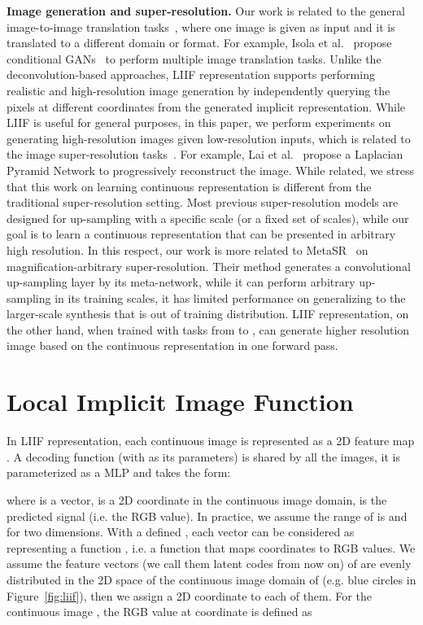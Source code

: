 \documentclass[final]{cvpr}
\begin{document}
\textbf{Image generation and super-resolution.} Our work is related to the general image-to-image translation tasks~\cite{zhang2016colorful,pix2pix2017,zhu2017unpaired,hoffman2018cycada,denton2015deep}, where one image is given as input and it is translated to a different domain or format. For example, Isola et al.~\cite{pix2pix2017} propose conditional GANs~\cite{goodfellow2014generative} to perform multiple image translation tasks. Unlike the deconvolution-based approaches, LIIF representation supports performing realistic and high-resolution image generation by independently querying the pixels at different coordinates from the generated implicit representation. While LIIF is useful for general purposes, in this paper, we perform experiments on generating high-resolution images given low-resolution inputs, which is related to the image super-resolution tasks~\cite{chang2004super,timofte2013anchored,tai2017memnet,dong2014learning,ledig2017photo,lim2017enhanced,lai2017deep,zhang2018residual,zhang2020deep}. For example, Lai et al.~\cite{lai2017deep} propose a Laplacian Pyramid Network to progressively reconstruct the image. While related, we stress that this work on learning continuous representation is different from the traditional super-resolution setting. Most previous super-resolution models are designed for up-sampling with a specific scale (or a fixed set of scales), while our goal is to learn a continuous representation that can be presented in arbitrary high resolution. In this respect, our work is more related to MetaSR~\cite{hu2019meta} on magnification-arbitrary super-resolution. Their method generates a convolutional up-sampling layer by its meta-network, while it can perform arbitrary up-sampling in its training scales, it has limited performance on generalizing to the larger-scale synthesis that is out of training distribution. LIIF representation, on the other hand, when trained with tasks from  to , can generate  higher resolution image based on the continuous representation in one forward pass.

\section{Local Implicit Image Function}

In LIIF representation, each continuous image  is represented as a 2D feature map . A decoding function  (with  as its parameters) is shared by all the images, it is parameterized as a MLP and takes the form:

where  is a vector,  is a 2D coordinate in the  continuous image domain,  is the predicted signal (i.e. the RGB value). In practice, we assume the range of  is  and  for two dimensions. With a defined , each vector  can be considered as representing a function , i.e. a function that maps coordinates to RGB values. We assume the  feature vectors (we call them latent codes from now on) of  are evenly distributed in the 2D space of the continuous image domain of  (e.g. blue circles in Figure~\ref{fig:liif}), then we assign a 2D coordinate to each of them. For the continuous image , the RGB value at coordinate  is defined as
\end{document}
